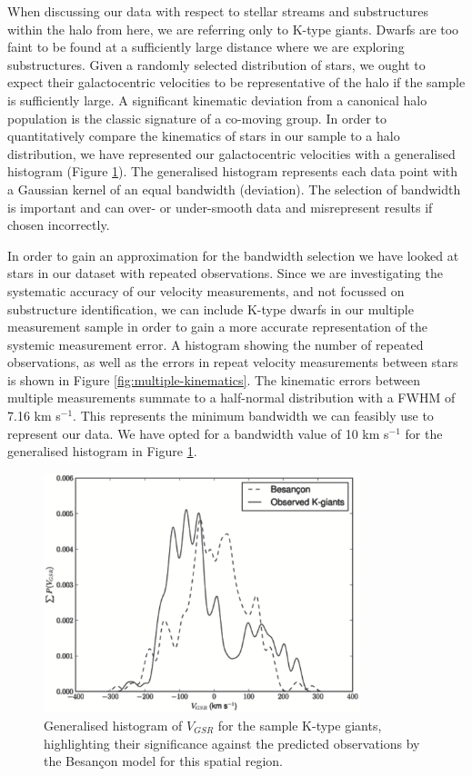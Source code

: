 \documentclass{emulateapj}
\begin{document}
		When discussing our data with respect to stellar streams and substructures within the halo from here, we are referring only to K-type giants.  Dwarfs are too faint to be found at a sufficiently large distance where we are exploring substructures. Given a randomly selected distribution of stars, we ought to expect their galactocentric velocities to be representative of the halo if the sample is sufficiently large. A significant kinematic deviation from a canonical halo population is the classic signature of a co-moving group. In order to quantitatively compare the kinematics of stars in our sample to a halo distribution, we have represented our galactocentric velocities with a generalised histogram (Figure \ref{fig:velocity-histogram}). The generalised histogram represents each data point with a Gaussian kernel of an equal bandwidth (deviation). The selection of bandwidth is important and can over- or under-smooth data and misrepresent results if chosen incorrectly.
		
		In order to gain an approximation for the bandwidth selection we have looked at stars in our dataset with repeated observations. Since we are investigating the systematic accuracy of our velocity measurements, and not focussed on substructure identification, we can include K-type dwarfs in our multiple measurement sample in order to gain a more accurate representation of the systemic measurement error. A histogram showing the number of repeated observations, as well as the errors in repeat velocity measurements between stars is shown in Figure \ref{fig:multiple-kinematics}. The kinematic errors between multiple measurements summate to a half-normal distribution with a FWHM of 7.16 km s$^{-1}$. This represents the minimum bandwidth we can feasibly use to represent our data. We have opted for a bandwidth value of 10 km s$^{-1}$ for the generalised histogram in Figure \ref{fig:velocity-histogram}.
	
		
\begin{figure}[h]
	\centering
	\includegraphics[width=9.2cm]{./figures/besancon_copy.eps}
	\caption{Generalised histogram of $V_{GSR}$ for the sample K-type giants, highlighting their significance against the predicted observations by the  Besan\c{c}on model for this spatial region.}
	\label{fig:velocity-histogram}
\end{figure}
\end{document}
